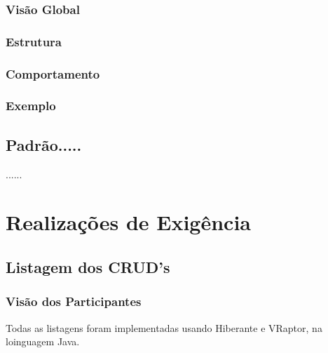 \documentclass[11pt, a4paper]{article}
\begin{document}
		    \subsubsection{Visão Global}
		
		    \subsubsection{Estrutura}
		
		    \subsubsection{Comportamento}
		
		    \subsubsection{Exemplo}
		        
		\subsection{Padrão.....}		
		    ......

		
	\section{Realizações de Exigência}
        
        \subsection{Listagem dos CRUD's}
		
	        \subsubsection{Visão dos Participantes}
                Todas as listagens foram implementadas usando Hiberante e VRaptor, na loinguagem Java.
		
\end{document}
